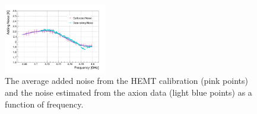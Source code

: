 \begin{figure} [htbp]
  \centering
  \includegraphics[width=0.4\textwidth,height = 0.25\textwidth]{figures/Avg_Noise_vs_Freq_run1to19_211118.png}
  \caption{The average added noise from the HEMT calibration (pink points) and 
 the noise estimated from the axion data (light blue points) as a function of frequency.}
  \label{fig:hemtcalvsf}
\end{figure}


  

